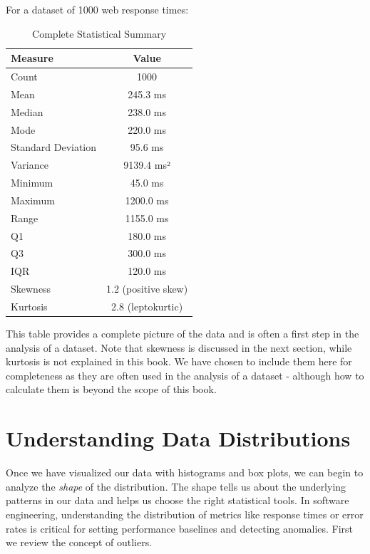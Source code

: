 \begin{example}

For a dataset of 1000 web response times:

\begin{table}[htbp]
\centering
\renewcommand{\arraystretch}{1.3}
\begin{tabular}{|l|c|}
\hline
\textbf{Measure} & \textbf{Value} \\
\hline
Count & 1000 \\
Mean & 245.3 ms \\
Median & 238.0 ms \\
Mode & 220.0 ms \\
Standard Deviation & 95.6 ms \\
Variance & 9139.4 ms² \\
Minimum & 45.0 ms \\
Maximum & 1200.0 ms \\
Range & 1155.0 ms \\
Q1 & 180.0 ms \\
Q3 & 300.0 ms \\
IQR & 120.0 ms \\
Skewness & 1.2 (positive skew) \\
Kurtosis & 2.8 (leptokurtic) \\
\hline
\end{tabular}
\caption{Complete Statistical Summary}
\label{tab:summary_stats}
\end{table}
\end{example}

This table provides a complete picture of the data and is often a first step in the analysis of a dataset. Note that skewness is discussed in the next section, while kurtosis is not explained in this book. We have chosen to include them here for completeness as they are often used in the analysis of a dataset - although how to calculate them is beyond the scope of this book.


\section{Understanding Data Distributions} \label{sec:data_distributions}
Once we have visualized our data with histograms and box plots, we can begin to analyze the \textit{shape} of the distribution. The shape tells us about the underlying patterns in our data and helps us choose the right statistical tools. In software engineering, understanding the distribution of metrics like response times or error rates is critical for setting performance baselines and detecting anomalies. First we review the concept of outliers.

